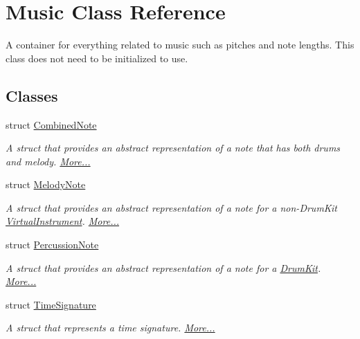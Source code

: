 \hypertarget{class_music}{}\section{Music Class Reference}
\label{class_music}


A container for everything related to music such as pitches and note lengths. This class does not need to be initialized to use.  


\subsection*{Classes}
\begin{DoxyCompactItemize}
\item 
struct \hyperlink{group___music_structs_struct_music_1_1_combined_note}{Combined\+Note}
\begin{DoxyCompactList}\small\item\em A struct that provides an abstract representation of a note that has both drums and melody.  \hyperlink{group___music_structs_struct_music_1_1_combined_note}{More...}\end{DoxyCompactList}\item 
struct \hyperlink{group___music_structs_struct_music_1_1_melody_note}{Melody\+Note}
\begin{DoxyCompactList}\small\item\em A struct that provides an abstract representation of a note for a non-\/\+Drum\+Kit \hyperlink{class_virtual_instrument}{Virtual\+Instrument}.  \hyperlink{group___music_structs_struct_music_1_1_melody_note}{More...}\end{DoxyCompactList}\item 
struct \hyperlink{group___music_structs_struct_music_1_1_percussion_note}{Percussion\+Note}
\begin{DoxyCompactList}\small\item\em A struct that provides an abstract representation of a note for a \hyperlink{class_drum_kit}{Drum\+Kit}.  \hyperlink{group___music_structs_struct_music_1_1_percussion_note}{More...}\end{DoxyCompactList}\item 
struct \hyperlink{group___music_structs_struct_music_1_1_time_signature}{Time\+Signature}
\begin{DoxyCompactList}\small\item\em A struct that represents a time signature.  \hyperlink{group___music_structs_struct_music_1_1_time_signature}{More...}\end{DoxyCompactList}\end{DoxyCompactItemize}

